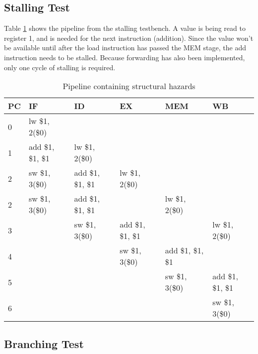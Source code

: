 \subsection{Stalling Test}
Table \ref{tbl:stalling} shows the pipeline from the stalling testbench.
A value is being read to register 1, and is needed for the next instruction (addition).
Since the value won't be available until after the load instruction has passed the MEM stage,
the add instruction needs to be stalled.
Because forwarding has also been implemented, only one cycle of stalling is required.
\begin{table}[h]
    \begin{tabular}{l|lllll}
    PC & IF                & ID                & EX                & MEM               & WB                \\ \hline
    0  & lw \$1, 2(\$0)    & ~                 & ~                 & ~                 & ~                 \\
    1  & add \$1, \$1, \$1 & lw \$1, 2(\$0)    & ~                 & ~                 & ~                 \\
    2  & sw \$1, 3(\$0)    & add \$1, \$1, \$1 & lw \$1, 2(\$0)    & ~                 & ~                 \\
    2  & sw \$1, 3(\$0)    & add \$1, \$1, \$1 & ~                 & lw \$1, 2(\$0)    & ~                 \\
    3  & ~                 & sw \$1, 3(\$0)    & add \$1, \$1, \$1 & ~                 & lw \$1, 2(\$0)    \\
    4  & ~                 & ~                 & sw \$1, 3(\$0)    & add \$1, \$1, \$1 & ~                 \\
    5  & ~                 & ~                 & ~                 & sw \$1, 3(\$0)    & add \$1, \$1, \$1 \\
    6  & ~                 & ~                 & ~                 & ~                 & sw \$1, 3(\$0)    \\
    \end{tabular}
\caption{Pipeline containing structural hazards}
\label{tbl:stalling}
\end{table}

\subsection{Branching Test}


